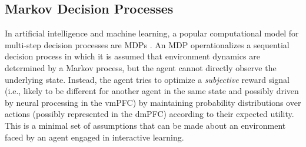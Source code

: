 \documentclass[10pt,letterpaper]{article}
\begin{document}
\subsection{Markov Decision Processes}
In artificial intelligence and machine learning, a popular computational model for
multi-step decision processes are
MDPs \citep{sutton1998reinforcement}.
An MDP operationalizes a sequential decision process
in which it is assumed that environment dynamics are determined by a Markov process,
but the agent cannot directly observe the underlying state.
Instead, the agent tries to optimize a \textit{subjective} reward
signal (i.e., likely to be different for another agent in the same state
and possibly driven by neural processing in the vmPFC)
by maintaining probability distributions over actions
(possibly represented in the dmPFC)
according to their expected utility.
This is a minimal set of assumptions that can be made about an environment faced by an agent engaged in interactive learning.
\end{document}

